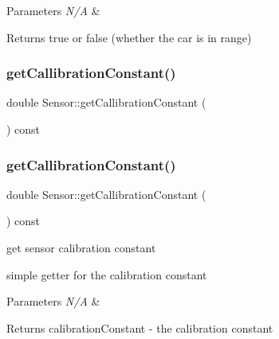 \begin{DoxyParams}{Parameters}
{\em N/A} & \\
\hline
\end{DoxyParams}
\begin{DoxyReturn}{Returns}
true or false (whether the car is in range) 
\end{DoxyReturn}
\mbox{\label{class_sensor_a715ecf9ba535991cacc7372073ba1355}} 
\subsubsection{\texorpdfstring{get\+Callibration\+Constant()}{getCallibrationConstant()}\hspace{0.1cm}{\footnotesize\ttfamily [1/2]}}
{\footnotesize\ttfamily double Sensor\+::get\+Callibration\+Constant (\begin{DoxyParamCaption}{ }\end{DoxyParamCaption}) const}

\mbox{\label{class_sensor_a715ecf9ba535991cacc7372073ba1355}} 
\subsubsection{\texorpdfstring{get\+Callibration\+Constant()}{getCallibrationConstant()}\hspace{0.1cm}{\footnotesize\ttfamily [2/2]}}
{\footnotesize\ttfamily double Sensor\+::get\+Callibration\+Constant (\begin{DoxyParamCaption}{ }\end{DoxyParamCaption}) const}



get sensor calibration constant 

simple getter for the calibration constant


\begin{DoxyParams}{Parameters}
{\em N/A} & \\
\hline
\end{DoxyParams}
\begin{DoxyReturn}{Returns}
calibration\+Constant -\/ the calibration constant 
\end{DoxyReturn}
\mbox{\label{class_sensor_aa3ed2c53fe69cdf256574edc0ccacdcf}} 
